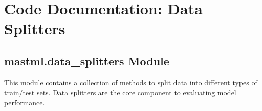 \documentclass[letterpaper,10pt,english]{sphinxmanual}
\begin{document}
\chapter{Code Documentation: Data Splitters}
\label{\detokenize{2_data_splitters:code-documentation-data-splitters}}\label{\detokenize{2_data_splitters::doc}}

\section{mastml.data\_splitters Module}
\label{\detokenize{2_data_splitters:module-mastml.data_splitters}}\label{\detokenize{2_data_splitters:mastml-data-splitters-module}}
This module contains a collection of methods to split data into different types of train/test sets. Data splitters
are the core component to evaluating model performance.
\end{document}
